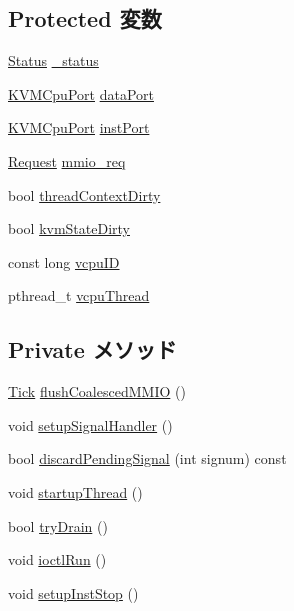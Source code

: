 \subsection*{Protected 変数}
\begin{DoxyCompactItemize}
\item 
\hyperlink{classBaseKvmCPU_a67a0db04d321a74b7e7fcfd3f1a3f70b}{Status} \hyperlink{classBaseKvmCPU_a6cdf6e6db875a442f3ab6db542bd2bb5}{\_\-status}
\item 
\hyperlink{classBaseKvmCPU_1_1KVMCpuPort}{KVMCpuPort} \hyperlink{classBaseKvmCPU_a3f709bd88ed61bca6788f8cc3cda97cb}{dataPort}
\item 
\hyperlink{classBaseKvmCPU_1_1KVMCpuPort}{KVMCpuPort} \hyperlink{classBaseKvmCPU_a3d1157769fdf1f3b9566f70b9e7c30ea}{instPort}
\item 
\hyperlink{classRequest}{Request} \hyperlink{classBaseKvmCPU_a22caf021a7ece8d92e5ab612191b1b57}{mmio\_\-req}
\item 
bool \hyperlink{classBaseKvmCPU_a8d712456c8dd8a9842aa40a69dbc27dd}{threadContextDirty}
\item 
bool \hyperlink{classBaseKvmCPU_a32fdccc14987171c2381947096c363f1}{kvmStateDirty}
\item 
const long \hyperlink{classBaseKvmCPU_ac52bdf6886dcfd53068633de9ed83184}{vcpuID}
\item 
pthread\_\-t \hyperlink{classBaseKvmCPU_a8a181f878f7db2579a3a67dd2d8c5902}{vcpuThread}
\end{DoxyCompactItemize}
\subsection*{Private メソッド}
\begin{DoxyCompactItemize}
\item 
\hyperlink{base_2types_8hh_a5c8ed81b7d238c9083e1037ba6d61643}{Tick} \hyperlink{classBaseKvmCPU_a2858df681aa95b652e3d371d56def5a3}{flushCoalescedMMIO} ()
\item 
void \hyperlink{classBaseKvmCPU_acae9fda1e38c2cd8a3d7c8659a4a66fa}{setupSignalHandler} ()
\item 
bool \hyperlink{classBaseKvmCPU_a8e9cbc5cd93017313960f88c346493ee}{discardPendingSignal} (int signum) const 
\item 
void \hyperlink{classBaseKvmCPU_abc1464ae4d17eb8f6ea86c6bb5f68532}{startupThread} ()
\item 
bool \hyperlink{classBaseKvmCPU_a250ca18dfc0316e340eaa2ec45d73c3e}{tryDrain} ()
\item 
void \hyperlink{classBaseKvmCPU_a745968f1246564028e5b3fd8dde0548d}{ioctlRun} ()
\item 
void \hyperlink{classBaseKvmCPU_a10bd071dda7c87970b3595b2d3c5408e}{setupInstStop} ()
\end{DoxyCompactItemize}

